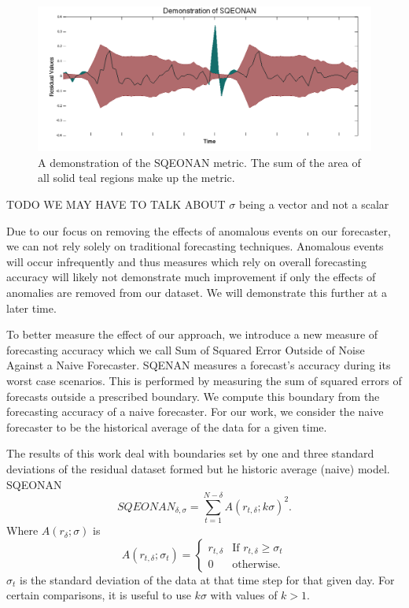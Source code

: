 \documentclass{sig-alternate}
\begin{document}
\begin{figure}[h]
\centering
\includegraphics[width = 1.0\linewidth]{demonstration_sqeonan.png}
\caption{A demonstration of the SQEONAN metric.  The sum of the area of all solid teal regions make up the metric.}
\label{fig:sqeonan_demo}
\end{figure}
TODO WE MAY HAVE TO TALK ABOUT $\sigma$ being a vector and not a scalar 

Due to our focus on removing the effects of anomalous events on our forecaster, we can not rely solely on traditional forecasting techniques.  Anomalous events will occur infrequently and thus measures which rely on overall forecasting accuracy will likely not demonstrate much improvement if only the effects of anomalies are removed from our dataset.  We will demonstrate this further at a later time.

To better measure the effect of our approach, we introduce a new measure of forecasting accuracy which we call Sum of Squared Error Outside of Noise Against a Naive Forecaster. SQENAN measures a forecast's accuracy during its worst case scenarios.  This is performed by measuring the sum of squared errors of forecasts outside a prescribed boundary.  We compute this boundary from the forecasting accuracy of a naive forecaster.  For our work, we consider the naive forecaster to be the historical average of the data for a given time.  

The results of this work deal with boundaries set by one and three standard deviations of the residual dataset formed but he historic average (naive) model.  SQEONAN
\begin{equation}
SQEONAN_{\delta, \sigma} = \sum_{t = 1}^{N - \delta}{A(r_{t, \delta}; k\sigma)^{2}} .
\end{equation}
Where $A(r_{\delta}; \sigma)$ is 
\begin{equation}
A(r_{t, \delta}; \sigma_{t}) = \begin{cases}
			r_{t, \delta}    &    \text{If }r_{t, \delta} \ge \sigma_{t} \\
			0                     &    \text{otherwise.}
			\end{cases}
\end{equation}
$\sigma_{t}$ is the standard deviation of the data at that time step for that given day.  For certain comparisons, it is useful to use $k\sigma$ with values of $k > 1$.  
\end{document}
